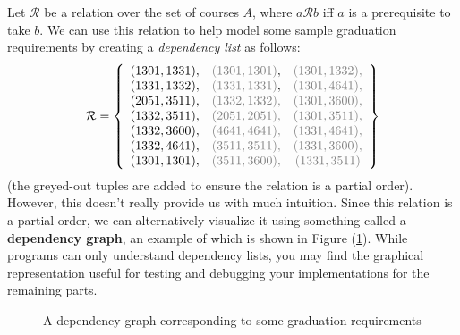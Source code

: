 \documentclass{article}
\newcommand{\gray}[1]{\textcolor{gray}{#1}}
\begin{document}
    Let $\mathcal{R}$ be a relation over the set of courses $A$, where $a \mathcal{R} b$ iff $a$ is a prerequisite to take $b$. We can use this relation to help model some sample graduation requirements by creating a \textit{dependency list} as follows:
    $$\mathcal{R} = 
    \left\{
    \begin{array}{ccc}
        (1301, 1331), & \gray{(1301, 1301)}, & \gray{(1301, 1332),} \\
        (1331, 1332), & \gray{(1331, 1331)}, & \gray{(1301, 4641),} \\
        (2051, 3511), & \gray{(1332, 1332),} & \gray{(1301, 3600),} \\
        (1332, 3511), & \gray{(2051, 2051),} & \gray{(1301, 3511),} \\
        (1332, 3600), & \gray{(4641, 4641),} & \gray{(1331, 4641),} \\
        (1332, 4641), & \gray{(3511, 3511),} & \gray{(1331, 3600),} \\
        (1301, 1301), & \gray{(3511, 3600),} & \gray{(1331, 3511)} \\
    \end{array}
    \right\}$$
    (the greyed-out tuples are added to ensure the relation is a partial order). However, this doesn't really provide us with much intuition. Since this relation is a partial order, we can alternatively visualize it using something called a \textbf{dependency graph}, an example of which is shown in Figure (\ref{fig:dependency_graph}). While programs can only understand dependency lists, you may find the graphical representation useful for testing and debugging your implementations for the remaining parts.
    
    \begin{figure}[htbp]
            \centering
            \caption{A dependency graph corresponding to some graduation requirements}
            \label{fig:dependency_graph}
        \end{figure}
\end{document}
